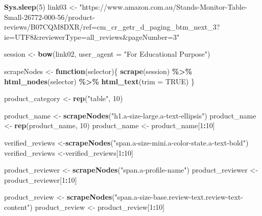\documentclass[
]{article}
\newenvironment{Shaded}{\begin{snugshade}}{\end{snugshade}}
\newcommand{\AttributeTok}[1]{\textcolor[rgb]{0.13,0.29,0.53}{#1}}
\newcommand{\ConstantTok}[1]{\textcolor[rgb]{0.56,0.35,0.01}{#1}}
\newcommand{\ControlFlowTok}[1]{\textcolor[rgb]{0.13,0.29,0.53}{\textbf{#1}}}
\newcommand{\DecValTok}[1]{\textcolor[rgb]{0.00,0.00,0.81}{#1}}
\newcommand{\FunctionTok}[1]{\textcolor[rgb]{0.13,0.29,0.53}{\textbf{#1}}}
\newcommand{\NormalTok}[1]{#1}
\newcommand{\OtherTok}[1]{\textcolor[rgb]{0.56,0.35,0.01}{#1}}
\newcommand{\SpecialCharTok}[1]{\textcolor[rgb]{0.81,0.36,0.00}{\textbf{#1}}}
\newcommand{\StringTok}[1]{\textcolor[rgb]{0.31,0.60,0.02}{#1}}
\begin{document}
\begin{Shaded}
\begin{Highlighting}[]
   \FunctionTok{Sys.sleep}\NormalTok{(}\DecValTok{5}\NormalTok{)}
\NormalTok{link03 }\OtherTok{\textless{}{-}} \StringTok{"https://www.amazon.com.au/Stands{-}Monitor{-}Table{-}Small{-}26772{-}000{-}56/product{-}reviews/B07CQM8DXR/ref=cm\_cr\_getr\_d\_paging\_btm\_next\_3?ie=UTF8\&reviewerType=all\_reviews\&pageNumber=3"}


\NormalTok{  session }\OtherTok{\textless{}{-}} \FunctionTok{bow}\NormalTok{(link02,}
               \AttributeTok{user\_agent =} \StringTok{"For Educational Purpose"}\NormalTok{)}

\NormalTok{  scrapeNodes }\OtherTok{\textless{}{-}} \ControlFlowTok{function}\NormalTok{(selector)\{}
    \FunctionTok{scrape}\NormalTok{(session) }\SpecialCharTok{\%\textgreater{}\%}
      \FunctionTok{html\_nodes}\NormalTok{(selector) }\SpecialCharTok{\%\textgreater{}\%}
      \FunctionTok{html\_text}\NormalTok{(}\AttributeTok{trim =} \ConstantTok{TRUE}\NormalTok{)}
\NormalTok{  \}}

\NormalTok{  product\_category }\OtherTok{\textless{}{-}} \FunctionTok{rep}\NormalTok{(}\StringTok{"table"}\NormalTok{, }\DecValTok{10}\NormalTok{)}

\NormalTok{  product\_name }\OtherTok{\textless{}{-}} \FunctionTok{scrapeNodes}\NormalTok{(}\StringTok{"h1.a{-}size{-}large.a{-}text{-}ellipsis"}\NormalTok{)}
\NormalTok{  product\_name }\OtherTok{\textless{}{-}} \FunctionTok{rep}\NormalTok{(product\_name, }\DecValTok{10}\NormalTok{)}
\NormalTok{  product\_name }\OtherTok{\textless{}{-}}\NormalTok{ product\_name[}\DecValTok{1}\SpecialCharTok{:}\DecValTok{10}\NormalTok{]}
  
\NormalTok{  verified\_reviews }\OtherTok{\textless{}{-}}\FunctionTok{scrapeNodes}\NormalTok{(}\StringTok{"span.a{-}size{-}mini.a{-}color{-}state.a{-}text{-}bold"}\NormalTok{)}
\NormalTok{  verified\_reviews }\OtherTok{\textless{}{-}}\NormalTok{verified\_reviews[}\DecValTok{1}\SpecialCharTok{:}\DecValTok{10}\NormalTok{]}
  
\NormalTok{  product\_reviewer }\OtherTok{\textless{}{-}} \FunctionTok{scrapeNodes}\NormalTok{(}\StringTok{"span.a{-}profile{-}name"}\NormalTok{)}
\NormalTok{  product\_reviewer }\OtherTok{\textless{}{-}}\NormalTok{ product\_reviewer[}\DecValTok{1}\SpecialCharTok{:}\DecValTok{10}\NormalTok{]}
  
\NormalTok{  product\_review }\OtherTok{\textless{}{-}} \FunctionTok{scrapeNodes}\NormalTok{(}\StringTok{"span.a{-}size{-}base.review{-}text.review{-}text{-}content"}\NormalTok{)}
\NormalTok{  product\_review }\OtherTok{\textless{}{-}}\NormalTok{ product\_review[}\DecValTok{1}\SpecialCharTok{:}\DecValTok{10}\NormalTok{]}
  

\end{Highlighting}
\end{Shaded}
\end{document}
